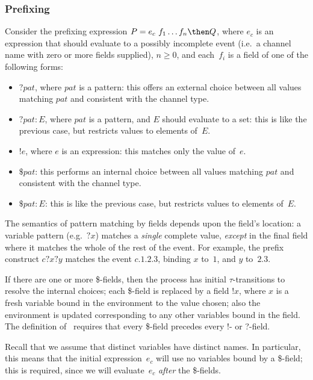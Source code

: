 \subsubsection{Prefixing}  
\label{sec:prefixing}

Consider the prefixing expression $P = e_c ~ f_1 \ldots f_n \then Q$, where
$e_c$ is an expression that should evaluate to a possibly incomplete event
(i.e.~a channel name with zero or more fields supplied), $n \ge 0$, and
each~$f_i$ is a field of one of the following forms:
  \begin{itemize}
  \item $? pat$, where $pat$ is a pattern: this offers an external choice
    between all values matching $pat$ and consistent with the channel type. 

  \item $?pat : E$, where $pat$ is a pattern, and $E$ should evaluate to a
    set: this is like the previous case, but restricts values to elements
    of~$E$. 

  \item $!e$, where $e$ is an expression: this matches only the value of~$e$. 

  \item $\$ pat$: this performs an internal choice between all values matching
    $pat$ and consistent with the channel type.
 
  \item $\$ pat : E$: this is like the previous case, but restricts values to
    elements of~$E$.
  \end{itemize}
  The semantics of pattern matching by fields depends upon the field's
  location: a variable pattern (e.g.~$?x$) matches a \emph{single} complete
  value, \emph{except} in the final field where it matches the whole of the
  rest of the event.  For example, the prefix construct $c?x?y$ matches the
  event $c.1.2.3$, binding $x$ to~$1$, and $y$ to~$2.3$.

  If there are one or more \$-fields, then the process has initial
  $\tau$-transitions to resolve the internal choices; each \$-field is
  replaced by a field $!x$, where $x$ is a fresh variable bound in the
  environment to the value chosen; also the environment is updated
  corresponding to any other variables bound in the field.  The definition of
  \CSPm\ requires that every \$-field precedes every !- or ?-field.

  Recall that we assume that distinct variables have distinct names.  In
  particular, this means that the initial expression~$e_c$ will use no
  variables bound by a \$-field; this is required, since we will
  evaluate~$e_c$ \emph{after} the \$-fields. 

